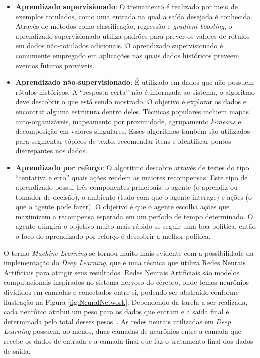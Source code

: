 \documentclass[portugues]{ic-tese}
\begin{document}
\begin{itemize}
\item \textbf{Aprendizado supervisionado}: O treinamento é realizado por meio de exemplos rotulados, como uma entrada na qual a saída desejada é conhecida. Através de métodos como classificação, regressão e \textit{gradient boosting}, o aprendizado supervisionado utiliza padrões para prever os valores de rótulos em dados não-rotulados adicionais. O aprendizado supervisionado é comumente empregado em aplicações nas quais dados históricos preveem eventos futuros prováveis.
\item \textbf{Aprendizado não-supervisionado}: É utilizado em dados que não possuem rótulos históricos. A “resposta certa” não é informada ao sistema, o algoritmo deve descobrir o que está sendo mostrado. O objetivo é explorar os dados e encontrar alguma estrutura dentro deles. Técnicas populares incluem mapas auto-organizáveis, mapeamento por proximidade, agrupamento \textit{k-means} e decomposição em valores singulares. Esses algoritmos também são utilizados para segmentar tópicos de texto, recomendar itens e identificar pontos discrepantes nos dados.
\item \textbf{Aprendizado por reforço}: O algoritmo descobre através de testes do tipo “tentativa e erro” quais ações rendem as maiores recompensas. Este tipo de aprendizado possui três componentes principais: o agente (o aprendiz ou tomador de decisão), o ambiente (tudo com que o agente interage) e ações (o que o agente pode fazer). O objetivo é que o agente escolha ações que maximizem a recompensa esperada em um período de tempo determinado. O agente atingirá o objetivo muito mais rápido se seguir uma boa política, então o foco do aprendizado por reforço é descobrir a melhor política.
\end{itemize}

O termo \textit{Machine Learning} se tornou muito mais evidente com a possibilidade da implementação do \textit{Deep Learning}, que é uma técnica que utiliza Redes Neurais Artificiais para atingir seus resultados. Redes Neurais Artificiais são modelos computacionais inspirados no sistema nervoso do cérebro, onde temos neurônios divididos em camadas e conectados entre si, podendo ser abstraído conforme ilustração na Figura \ref{fig:NeuralNetwork}. Dependendo da tarefa a ser realizada, cada neurônio atribui um peso para os dados que entram e a saída final é determinada pelo total desses pesos~\citep{Copeland_2016}. As redes neurais utilizadas em \textit{Deep Learning} possuem, ao menos, duas camadas de neurônios entre a camada que recebe os dados de entrada e a camada final que faz o tratamento final dos dados de saída.
\end{document}
